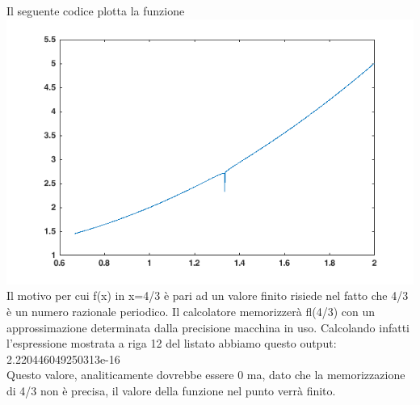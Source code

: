 Il seguente codice plotta la funzione \\

\includegraphics[scale=0.8]{cap_1/es13/es13.png}\\
Il  motivo per cui f(x) in x=4/3 è pari ad un valore finito risiede nel fatto che 4/3 è un numero razionale periodico.
Il calcolatore memorizzerà fl(4/3) con un approssimazione determinata dalla precisione macchina in uso.
Calcolando infatti l'espressione mostrata a riga 12 del listato abbiamo questo output:\\   2.220446049250313e-16\\
Questo valore, analiticamente dovrebbe essere 0 ma, dato che la memorizzazione di 4/3 non è precisa, il valore della funzione nel punto verrà finito.

